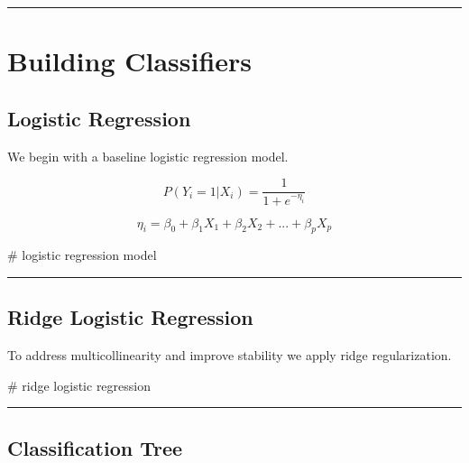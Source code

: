 \documentclass[
  letterpaper,
  DIV=11,
  numbers=noendperiod]{scrartcl}
\newenvironment{Shaded}{\begin{snugshade}}{\end{snugshade}}
\newcommand{\CommentTok}[1]{\textcolor[rgb]{0.37,0.37,0.37}{#1}}
\begin{document}
\begin{center}\rule{0.5\linewidth}{0.5pt}\end{center}

\section{Building Classifiers}\label{building-classifiers}

\subsection{Logistic Regression}\label{logistic-regression}

We begin with a baseline logistic regression model.

\[
P(Y_i = 1|X_i) =
\frac{1}{1 + e^{-\eta_i}}
\]

\[
\eta_i = \beta_0 + \beta_1 X_1 + \beta_2 X_2 + ... + \beta_p X_p
\]

\begin{Shaded}
\begin{Highlighting}[]
\CommentTok{\# logistic regression model}
\end{Highlighting}
\end{Shaded}

\begin{center}\rule{0.5\linewidth}{0.5pt}\end{center}

\subsection{Ridge Logistic Regression}\label{ridge-logistic-regression}

To address multicollinearity and improve stability we apply ridge
regularization.

\begin{Shaded}
\begin{Highlighting}[]
\CommentTok{\# ridge logistic regression}
\end{Highlighting}
\end{Shaded}

\begin{center}\rule{0.5\linewidth}{0.5pt}\end{center}

\subsection{Classification Tree}\label{classification-tree}
\end{document}
